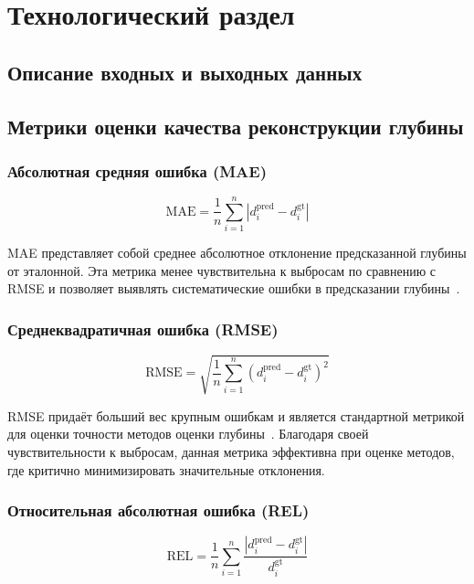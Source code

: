 \chapter{Технологический раздел}


\section{Описание входных и выходных данных}


\section{Метрики оценки качества реконструкции глубины}

\subsection{Абсолютная средняя ошибка (MAE)}
\begin{equation}
\text{MAE} = \frac{1}{n} \sum_{i=1}^{n} |d_{i}^{\text{pred}} - d_{i}^{\text{gt}}|
\end{equation}

MAE представляет собой среднее абсолютное отклонение предсказанной глубины от эталонной. Эта метрика менее чувствительна к выбросам по сравнению с RMSE и позволяет выявлять систематические ошибки в предсказании глубины~\cite{zhang2025review}.

\subsection{Среднеквадратичная ошибка (RMSE)}
\begin{equation}
\text{RMSE} = \sqrt{\frac{1}{n} \sum_{i=1}^{n} (d_{i}^{\text{pred}} - d_{i}^{\text{gt}})^2}
\end{equation}

RMSE придаёт больший вес крупным ошибкам и является стандартной метрикой для оценки точности методов оценки глубины~\cite{vis3}. Благодаря своей чувствительности к выбросам, данная метрика эффективна при оценке методов, где критично минимизировать значительные отклонения.

\subsection{Относительная абсолютная ошибка (REL)}
\begin{equation}
\text{REL} = \frac{1}{n} \sum_{i=1}^{n} \frac{|d_{i}^{\text{pred}} - d_{i}^{\text{gt}}|}{d_{i}^{\text{gt}}}
\end{equation}

